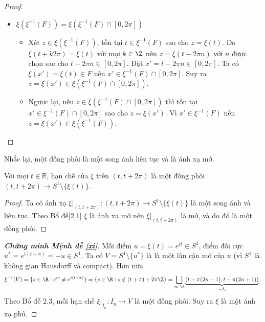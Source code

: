 \begin{proof}
\begin{itemize}
			\item $\xi(\xi^{-1}(F)) = \xi(\xi^{-1}(F) \cap [0, 2\pi])$
			\begin{itemize}
				\item Xét $z\in \xi(\xi^{-1}(F))$, tồn tại $t\in \xi^{-1}(F)$ sao cho $z=\xi(t)$. Do $\xi(t+k2\pi)=\xi(t)$ với mọi $k\in \Z$ nên $z=\xi(t-2\pi n)$ với $n$ được chọn sao cho $t-2\pi n\in [0,2\pi]$. Đặt $x'=t-2\pi n \in [0,2\pi]$. Ta có $\xi(x')=\xi(t)\in F$ nên $x'\in \xi^{-1}(F)\cap [0,2\pi]$. Suy ra $z=\xi(x')\in \xi(\xi^{-1}(F)\cap [0,2\pi])$.
				
				\item Ngược lại, nếu $z\in \xi(\xi^{-1}(F) \cap [0, 2\pi])$ thì tồn tại $x'\in \xi^{-1}(F)\cap [0,2\pi]$ sao cho $z=\xi(x')$. Vì $x'\in \xi^{-1}(F)$ nên $z=\xi(x')\in \xi(\xi^{-1}(F))$.
			\end{itemize}
		\end{itemize}
	\end{proof}
	Nhắc lại, một đồng phôi là một song ánh liên tục và là ánh xạ mở.
	\begin{lemma} Với mọi $t\in \mathbb{R}$, hạn chế
		của $\xi$ trên
		$(t, t + 2\pi)$ là một đồng phôi $ (t, t + 2\pi)\to S^1 \setminus \{\xi(t)\}$.
	\end{lemma}

	\begin{proof}
		 Ta có ánh xạ $\xi|_{(t, t+2\pi)}: (t,t+2\pi)\to S^1 \setminus \{\xi(t)\}$ là một song ánh và liên tục. Theo Bổ đề\ref{2.1}
		 $\xi$ là ánh xạ mở 
		 nên $\xi|_{(t,t+2\pi)}$ là mở, và do đó là một đồng phôi.
	\end{proof}
	
	\begin{proof}[{\bf Chứng minh Mệnh đề \ref{xi}}]
		Mỗi điểm $ u = \xi(t) = e^{it} \in S^1 $, %
		điểm đối cực $ u^* = e^{i(t+\pi)}  = -u\in S^1$. 
		Ta có %
		$ V = S^1 \setminus \{u^*\} $ là là một lân cận mở của $u$ (vì $ S^1 $ là không gian Hausdorff và compact).
		Hơn nữa%
		\[\xi^{-1}(V)=\{s\in \R: e^{is} \neq e^{i(t + \pi)}\}=\{s\in \R: s \notin (t + \pi) +2\pi \Z\} = \bigsqcup_{n\in \Z} \underbrace{(t + \pi(2n - 1), t + \pi(2n + 1))}_{:=I_n}.\]
		Theo Bổ đề 2.3, %
		mỗi hạn chế $\xi|_{I_n}: I_n \to V$ là một đồng phôi.%
		Suy ra $\xi$ là một ánh xạ phủ.
	\end{proof}
	
